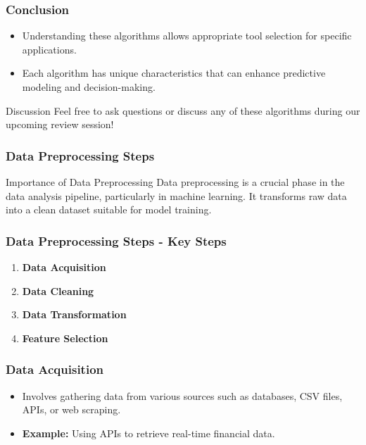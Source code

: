 \documentclass[aspectratio=169]{beamer}
\begin{document}
\begin{frame}[fragile]
    \frametitle{Conclusion}
    \begin{itemize}
        \item Understanding these algorithms allows appropriate tool selection for specific applications.
        \item Each algorithm has unique characteristics that can enhance predictive modeling and decision-making.
    \end{itemize}
    \begin{block}{Discussion}
        Feel free to ask questions or discuss any of these algorithms during our upcoming review session!
    \end{block}
\end{frame}

\begin{frame}
    \frametitle{Data Preprocessing Steps}
    \begin{block}{Importance of Data Preprocessing}
        Data preprocessing is a crucial phase in the data analysis pipeline, particularly in machine learning. It transforms raw data into a clean dataset suitable for model training.
    \end{block}
\end{frame}

\begin{frame}
    \frametitle{Data Preprocessing Steps - Key Steps}
    \begin{enumerate}
        \item \textbf{Data Acquisition}
        \item \textbf{Data Cleaning}
        \item \textbf{Data Transformation}
        \item \textbf{Feature Selection}
    \end{enumerate}
\end{frame}

\begin{frame}
    \frametitle{Data Acquisition}
    \begin{itemize}
        \item Involves gathering data from various sources such as databases, CSV files, APIs, or web scraping.
        \item \textbf{Example:} Using APIs to retrieve real-time financial data.
    \end{itemize}
\end{frame}
\end{document}
